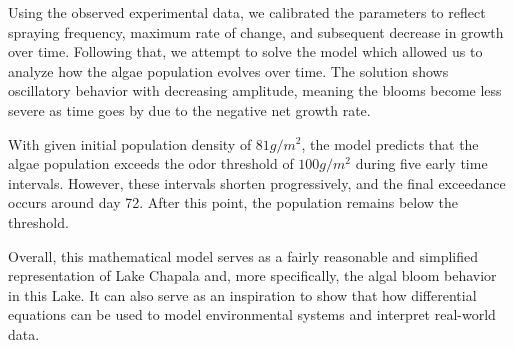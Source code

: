 \documentclass[11pt]{article}
\begin{document}
Using the observed experimental data, we calibrated the parameters to reflect spraying frequency, maximum rate of change, and subsequent decrease in growth over time. Following that, we attempt to solve the model which allowed us to analyze how the algae population evolves over time. The solution shows oscillatory behavior with decreasing amplitude, meaning the blooms become less severe as time goes by due to the negative net growth rate.

With given initial population density of $81g/m^2$, the model predicts that the algae population exceeds the odor threshold of $100g/m^2$ during five early time intervals. However, these intervals shorten progressively, and the final exceedance occurs around day 72. After this point, the population remains below the threshold.

Overall, this mathematical model serves as a fairly reasonable and simplified representation of Lake Chapala and, more specifically, the algal bloom behavior in this Lake. It can also serve as an inspiration to show that how differential equations can be used to model environmental systems and interpret real-world data.



\end{document}

